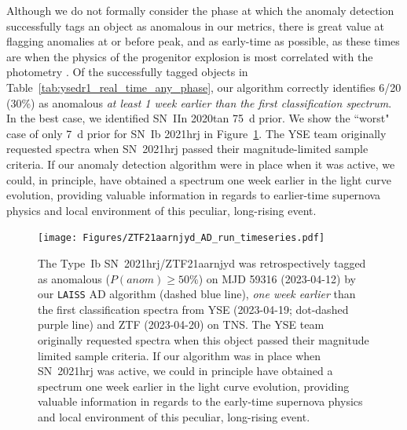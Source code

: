 \documentclass[twocolumn]{aastex63}
\begin{document}
Although we do not formally consider the phase at which the anomaly detection successfully tags an object as anomalous in our metrics, there is great value at flagging anomalies at or before peak, and as early-time as possible, as these times are when the physics of the progenitor explosion is most correlated with the photometry \citep{Gagliano2022}. Of the successfully tagged objects in Table~\ref{tab:ysedr1_real_time_any_phase}, our algorithm correctly identifies 6/20 (30\%) as anomalous \emph{at least 1 week earlier than the first classification spectrum}. In the best case, we identified SN~IIn 2020tan 75~d prior. We show the ``worst" case of only 7~d prior for SN~Ib 2021hrj in Figure~\ref{fig:2021hrj}. The YSE team originally requested spectra when SN~2021hrj passed their magnitude-limited sample criteria. If our anomaly detection algorithm were in place when it was active, we could, in principle, have obtained a spectrum one week earlier in the light curve evolution, providing valuable information in regards to earlier-time supernova physics and local environment of this peculiar, long-rising event. 

\begin{figure}
    \centering
    \texttt{[image: Figures/ZTF21aarnjyd\_AD\_run\_timeseries.pdf]}
    \caption{
    The Type~Ib SN~2021hrj/ZTF21aarnjyd was retrospectively tagged as anomalous ($P(anom)\geq50\%$) on MJD 59316 (2023-04-12) by our \texttt{LAISS} AD algorithm (dashed blue line), \emph{one week earlier} than the first classification spectra from YSE (2023-04-19; dot-dashed purple line) and ZTF (2023-04-20) on TNS. The YSE team originally requested spectra when this object passed their magnitude limited sample criteria. If our algorithm was in place when SN~2021hrj was active, we could in principle have obtained a spectrum one week earlier in the light curve evolution, providing valuable information in regards to the early-time supernova physics and local environment of this peculiar, long-rising event.
    } 
    \label{fig:2021hrj}
\end{figure}
\end{document}
